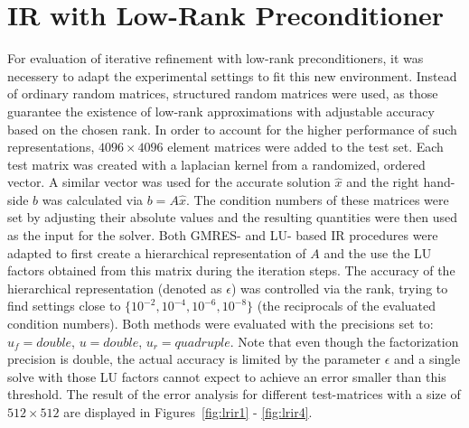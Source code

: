 \section{IR with Low-Rank Preconditioner}
\label{sec:low_rank}

For evaluation of iterative refinement with low-rank preconditioners, it was necessery to adapt the experimental settings to fit this new environment. Instead of ordinary random matrices, structured random matrices were used, as those guarantee the existence of low-rank approximations with adjustable accuracy based on the chosen rank. In order to account for the higher performance of such representations, $4096 \times 4096$ element matrices were added to the test set. Each test matrix was created with a laplacian kernel from a randomized, ordered vector. A similar vector was used for the accurate solution $\hat{x}$ and the right hand-side $b$ was calculated via $b = A\hat{x}$. The condition numbers of these matrices were set by adjusting their absolute values and the resulting quantities were then used as the input for the solver. Both GMRES- and LU- based IR procedures were adapted to first create a hierarchical representation of $A$ and the use the LU factors obtained from this matrix during the iteration steps. The accuracy of the hierarchical representation (denoted as $\epsilon$) was controlled via the rank, trying to find settings close to $\{10^{-2}, 10^{-4}, 10^{-6}, 10^{-8}\}$ (the reciprocals of the evaluated condition numbers).
Both methods were evaluated with the precisions set to: $u_f= double$, $u= double$, $u_r= quadruple$.
Note that even though the factorization precision is double, the actual accuracy is limited by the parameter $\epsilon$ and a single solve with those LU factors cannot expect to achieve an error smaller than this threshold. The result of the error analysis for different test-matrices with a size of $512 \times 512$ are displayed in Figures~\hyperref[fig:lrir1]{\ref{fig:lrir1}} - \hyperref[fig:lrir4]{\ref{fig:lrir4}}.

